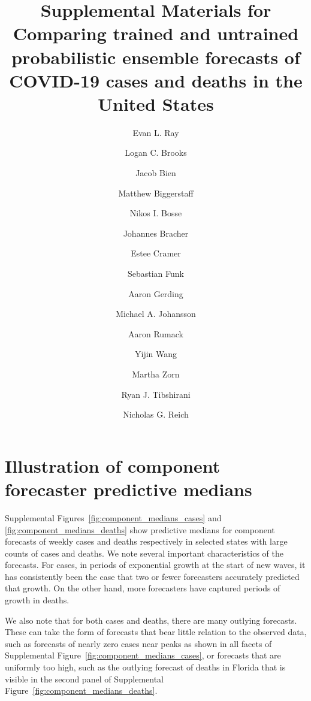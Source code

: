\documentclass{article}
\begin{document}
\title{Supplemental Materials for Comparing trained and untrained probabilistic ensemble forecasts of COVID-19 cases and deaths in the United States}

\author{Evan L. Ray
\and
Logan C. Brooks
\and
Jacob Bien
\and
Matthew Biggerstaff
\and
Nikos I. Bosse
\and
Johannes Bracher
\and
Estee Cramer
\and
Sebastian Funk
\and
Aaron Gerding
\and
Michael A. Johansson
\and
Aaron Rumack
\and
Yijin Wang
\and
Martha Zorn
\and
Ryan J. Tibshirani
\and
Nicholas G. Reich}


\date{}

\maketitle

\linenumbers

\section{Illustration of component forecaster predictive medians}

Supplemental Figures~\ref{fig:component_medians_cases} and \ref{fig:component_medians_deaths} show predictive medians for component forecasts of weekly cases and deaths respectively in selected states with large counts of cases and deaths. We note several important characteristics of the forecasts. For cases, in periods of exponential growth at the start of new waves, it has consistently been the case that two or fewer forecasters accurately predicted that growth. On the other hand, more forecasters have captured periods of growth in deaths.

We also note that for both cases and deaths, there are many outlying forecasts.
These can take the form of forecasts that bear little relation to the observed data, such as forecasts of nearly zero cases near peaks as shown in all facets of Supplemental Figure~\ref{fig:component_medians_cases}, or forecasts that are uniformly too high, such as the outlying forecast of deaths in Florida that is visible in the second panel of Supplemental Figure~\ref{fig:component_medians_deaths}.
\end{document}
